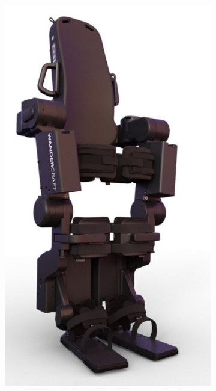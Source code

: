 \begin{figure}[h]
\begin{subfigure}{0.23\textwidth}
        \includegraphics[width=\textwidth]{figures/wandercraft_robot.jpeg}
    \end{subfigure}%
    \hfill
    \begin{subfigure}{0.485\textwidth}

\end{subfigure}
\end{figure}
